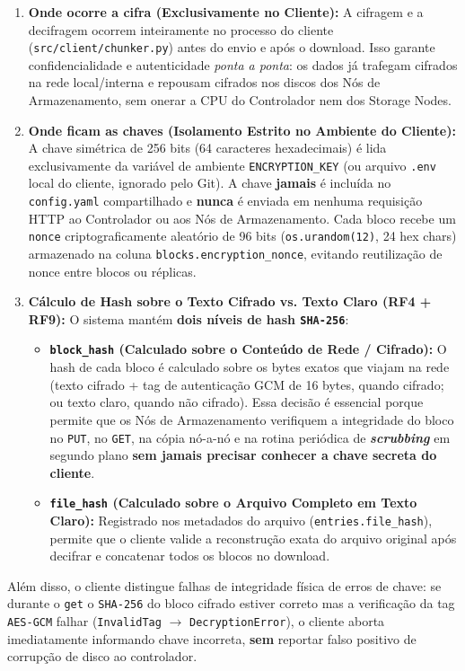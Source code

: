 \documentclass[10pt,a4paper]{article}
\begin{document}
\begin{enumerate}
    \item \textbf{Onde ocorre a cifra (Exclusivamente no Cliente):} A cifragem e a decifragem ocorrem inteiramente no processo do cliente (\texttt{src/client/chunker.py}) antes do envio e após o download. Isso garante confidencialidade e autenticidade \textit{ponta a ponta}: os dados já trafegam cifrados na rede local/interna e repousam cifrados nos discos dos Nós de Armazenamento, sem onerar a CPU do Controlador nem dos Storage Nodes.
    \item \textbf{Onde ficam as chaves (Isolamento Estrito no Ambiente do Cliente):} A chave simétrica de 256 bits (64 caracteres hexadecimais) é lida exclusivamente da variável de ambiente \texttt{ENCRYPTION\_KEY} (ou arquivo \texttt{.env} local do cliente, ignorado pelo Git). A chave \textbf{jamais} é incluída no \texttt{config.yaml} compartilhado e \textbf{nunca} é enviada em nenhuma requisição HTTP ao Controlador ou aos Nós de Armazenamento. Cada bloco recebe um \texttt{nonce} criptograficamente aleatório de 96 bits (\texttt{os.urandom(12)}, 24 hex chars) armazenado na coluna \texttt{blocks.encryption\_nonce}, evitando reutilização de nonce entre blocos ou réplicas.
    \item \textbf{Cálculo de Hash sobre o Texto Cifrado vs. Texto Claro (RF4 + RF9):} O sistema mantém \textbf{dois níveis de hash \texttt{SHA-256}}:
    \begin{itemize}
        \item \textbf{\texttt{block\_hash} (Calculado sobre o Conteúdo de Rede / Cifrado):} O hash de cada bloco é calculado sobre os bytes exatos que viajam na rede (texto cifrado + tag de autenticação GCM de 16 bytes, quando cifrado; ou texto claro, quando não cifrado). Essa decisão é essencial porque permite que os Nós de Armazenamento verifiquem a integridade do bloco no \texttt{PUT}, no \texttt{GET}, na cópia nó-a-nó e na rotina periódica de \textbf{\textit{scrubbing}} em segundo plano \textbf{sem jamais precisar conhecer a chave secreta do cliente}.
        \item \textbf{\texttt{file\_hash} (Calculado sobre o Arquivo Completo em Texto Claro):} Registrado nos metadados do arquivo (\texttt{entries.file\_hash}), permite que o cliente valide a reconstrução exata do arquivo original após decifrar e concatenar todos os blocos no download.
    \end{itemize}
\end{enumerate}

Além disso, o cliente distingue falhas de integridade física de erros de chave: se durante o \texttt{get} o \texttt{SHA-256} do bloco cifrado estiver correto mas a verificação da tag \texttt{AES-GCM} falhar (\texttt{InvalidTag} $\rightarrow$ \texttt{DecryptionError}), o cliente aborta imediatamente informando chave incorreta, \textbf{sem} reportar falso positivo de corrupção de disco ao controlador.
\end{document}
